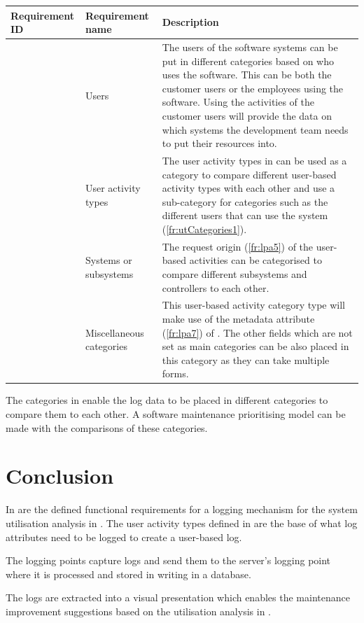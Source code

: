 \begin{table}[!htb]
	\centering
	\caption[System utilisation analysis categories functional requirements (\ref{fr:systemUtiReq})]
	{\textit{System utilisation analysis categories functional requirements (\ref{fr:systemUtiReq})}}
	\label{tbl:ch2_utilisationCategories}
	\begin{xltabular}{\textwidth}{|l|l|X|}
		\hline \textbf{Requirement ID} & \textbf{Requirement name} & \textbf{Description} \\
		\hline {} & Users & The users of the software systems can be put in different categories based on who uses the software. This can be both the customer users or the employees using the software. Using the activities of the customer users will provide the data on which systems the development team needs to put their resources into. \\
		\hline {} & User activity types & The user activity types in  can be used as a category to compare different user-based activity types with each other and use a sub-category for categories such as the different users that can use the system (\ref{fr:utCategories1}). \\
		\hline {} & Systems or subsystems & The request origin (\ref{fr:lpa5}) of the user-based activities can be categorised to compare different subsystems and controllers to each other.\\
		\hline {} & Miscellaneous categories & This user-based activity category type will make use of the metadata attribute (\ref{fr:lpa7}) of . The other fields which are not set as main categories can be also placed in this category as they can take multiple forms.\\
		\hline
	\end{xltabular}
\end{table}

The categories in  enable the log data to be placed in different categories to compare them to each other. A software maintenance prioritising model can be made with the comparisons of these categories.

\section{Conclusion}
In  are the defined functional requirements for a logging mechanism for the system utilisation analysis in . The user activity types defined in  are the base of what log attributes need to be logged to create a user-based log.\par The logging points capture logs and send them to the server's logging point where it is processed and stored in writing in a database.\par The logs are extracted into a visual presentation which enables the maintenance improvement suggestions based on the utilisation analysis in .